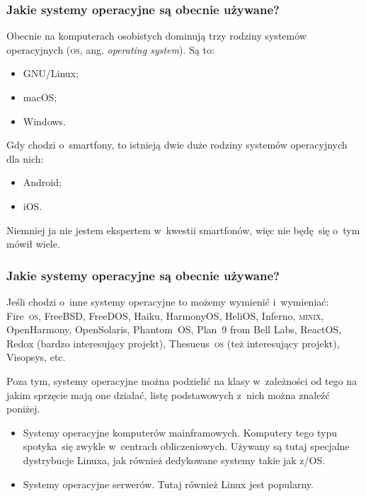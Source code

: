 \documentclass[10pt,t]{beamer}
\begin{document}
\begin{frame}
  \frametitle{Jakie systemy operacyjne są obecnie używane?}


  Obecnie na komputerach osobistych dominują trzy rodziny systemów
  operacyjnych (\textsc{os}, ang. \textit{operating system}). Są to:
  \begin{itemize}

  \item GNU/Linux;

  \item macOS;

  \item Windows.

  \end{itemize}

  Gdy chodzi o~smartfony, to istnieją dwie duże rodziny systemów
  operacyjnych dla nich:
  \begin{itemize}

  \item Android;

  \item iOS.

  \end{itemize}
  Niemniej ja nie jestem ekspertem w~kwestii smartfonów, więc nie będę~się
  o~tym mówił wiele.

\end{frame}





\begin{frame}
  \frametitle{Jakie systemy operacyjne są obecnie używane?}


  Jeśli chodzi o~inne systemy operacyjne to możemy wymienić i~wymieniać:
  Fire~\textsc{os}, FreeBSD, FreeDOS, Haiku, HarmonyOS, HeliOS,
  Inferno, \textsc{minix}, OpenHarmony, OpenSolaris, Phantom~OS, Plan~9
  from Bell Labs, ReactOS, Redox (bardzo interesujący projekt),
  Thesueus~\textsc{os} (też interesujący projekt), Visopsys, etc.

  Poza tym, systemy operacyjne można podzielić na klasy w~zależności od
  tego na jakim sprzęcie mają one działać, listę podstawowych z~nich można
  znaleźć poniżej.

  \begin{itemize}

  \item Systemy operacyjne komputerów mainframowych. Komputery tego typu
    spotyka~się zwykle w~centrach obliczeniowych. Używany są tutaj specjalne
    dystrybucje Linuxa, jak również dedykowane systemy takie jak z/OS.



  \item Systemy operacyjne serwerów. Tutaj również Linux jest popularny.

  \end{itemize}

\end{frame}
\end{document}

